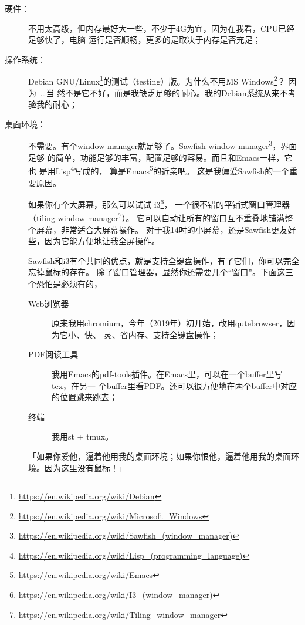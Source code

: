 \begin{description}
\item[硬件：]不用太高级，但内存最好大一些，不少于4G为宜，因为在我看，CPU已经足够快了，电脑
  运行是否顺畅，更多的是取决于内存是否充足；
\item[操作系统：]Debian
  GNU/Linux\footnote{\url{https://en.wikipedia.org/wiki/Debian}}的测试（testing）版。为什么不用MS
  Windows\footnote{\url{https://en.wikipedia.org/wiki/Microsoft_Windows}}？ 因为~\ldots 当
  然不是它不好，而是我缺乏足够的耐心。我的Debian系统从来不考验我的耐心；
\item[桌面环境：]不需要。有个window manager就足够了。Sawfish window
  manager\footnote{\url{https://en.wikipedia.org/wiki/Sawfish_(window_manager)}}，界面足够
  的简单，功能足够的丰富，配置足够的容易。而且和Emacs一样，它也
  是用Lisp\footnote{\url{https://en.wikipedia.org/wiki/Lisp_(programming_language)}}写成的，
  算是Emacs\footnote{\url{https://en.wikipedia.org/wiki/Emacs}}的近亲吧。
  这是我偏爱Sawfish的一个重要原因。

  如果你有个大屏幕，那么可以试试%
  i3\footnote{\url{https://en.wikipedia.org/wiki/I3_(window_manager)}}，%
  一个很不错的平铺式窗口管理器（tiling window%
  manager\footnote{\url{https://en.wikipedia.org/wiki/Tiling_window_manager}}）。%
  它可以自动让所有的窗口互不重叠地铺满整个屏幕，非常适合大屏幕操作。%
  对于我14吋的小屏幕，还是Sawfish更友好些，因为它能方便地让我全屏操作。%

  Sawfish和i3有个共同的优点，就是支持全键盘操作，有了它们，你可以完全忘掉鼠标的存在。
  除了窗口管理器，显然你还需要几个“窗口”。下面这三个恐怕是必须有的，

  \begin{description}
  \item[Web浏览器] 原来我用chromium，今年（2019年）初开始，改用qutebrowser，因为它小、快、
    灵、省内存、支持全键盘操作；
  \item[PDF阅读工具] 我用Emacs的pdf-tools插件。在Emacs里，可以在一个buffer里写tex，在另一
    个buffer里看PDF。还可以很方便地在两个buffer中对应的位置跳来跳去；
  \item[终端] 我用st + tmux。
  \end{description}

  「如果你爱他，逼着他用我的桌面环境；如果你恨他，逼着他用我的桌面环境。因为这里没有鼠标！」
  

\end{description}
